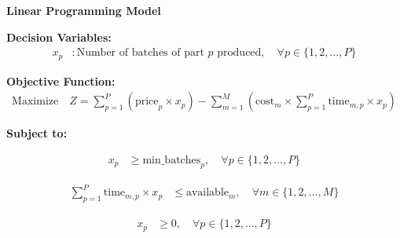 \documentclass{article}
\begin{document}
\textbf{Linear Programming Model}

\textbf{Decision Variables:}
\begin{align*}
x_p &: \text{Number of batches of part } p \text{ produced}, \quad \forall p \in \{1, 2, \ldots, P\}
\end{align*}

\textbf{Objective Function:}
\begin{align*}
\text{Maximize} \quad Z = \sum_{p=1}^{P} \left( \text{price}_p \times x_p \right) - \sum_{m=1}^{M} \left( \text{cost}_m \times \sum_{p=1}^{P} \text{time}_{m,p} \times x_p \right)
\end{align*}

\textbf{Subject to:}

\begin{align*}
x_p &\geq \text{min_batches}_p, \quad \forall p \in \{1, 2, \ldots, P\}
\end{align*}

\begin{align*}
\sum_{p=1}^{P} \text{time}_{m,p} \times x_p &\leq \text{available}_m, \quad \forall m \in \{1, 2, \ldots, M\}
\end{align*}

\begin{align*}
x_p &\geq 0, \quad \forall p \in \{1, 2, \ldots, P\}
\end{align*}
\end{document}
